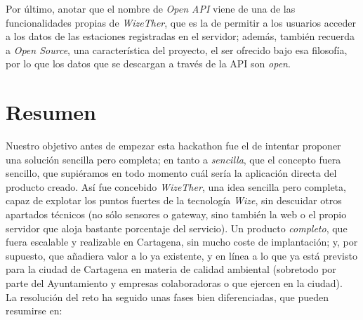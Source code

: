 \documentclass[12pt]{article}
\begin{document}
\noindent Por último, anotar que el nombre de \textit{Open API} viene de una de las funcionalidades  propias de \textit{WizeTher}, que es la de permitir a los usuarios acceder a los datos de las estaciones registradas en el servidor; además, también recuerda a \textit{Open Source}, una característica del proyecto, el ser ofrecido bajo esa filosofía, por lo que los datos que se descargan a través de la API son \textit{open}.

\pagebreak

\section{Resumen}

\noindent Nuestro objetivo antes de empezar esta hackathon fue el de intentar proponer una solución sencilla pero completa; en tanto a \textit{sencilla}, que el concepto fuera sencillo, que supiéramos en todo momento cuál sería la aplicación directa del producto creado. Así fue concebido \textit{WizeTher}, una idea sencilla pero completa, capaz de explotar los puntos fuertes de la tecnología \textit{Wize}, sin descuidar otros apartados técnicos (no sólo sensores o gateway, sino también la web o el propio servidor que aloja bastante porcentaje del servicio). Un producto \textit{completo}, que fuera escalable y realizable en Cartagena, sin mucho coste de implantación; y, por supuesto, que añadiera valor a lo ya existente, y en línea a lo que ya está previsto para la ciudad de Cartagena en materia de calidad ambiental (sobretodo por parte del Ayuntamiento y empresas colaboradoras o que ejercen en la ciudad). \\

\noindent La resolución del reto ha seguido unas fases bien diferenciadas, que pueden resumirse en:
\end{document}
